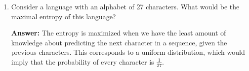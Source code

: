 \documentclass{article}
\newenvironment{QandA}{\begin{enumerate}[label=\arabic*.]}{\end{enumerate}}
\newenvironment{answer}{\par\normalfont \textbf{Answer:}}{}
\newcommand{\g}{\vert}
\begin{document}
\begin{QandA}
\begin{answer}
        \begin{align*}
            w^* &= \argmax_{w} p(Y \g X, w) \\
            &= \argmax_{w} \prod_{i=1}^n p(y_i \g x_i, w) &\text{(iid assumption)} \\
            &= \argmax_{w} \sum_{i=1}^n \log p(y_i \g x_i, w) \\
            &= \argmax_{w} \sum_{i=1}^n \left [\log \left( \frac{1}{\sqrt{2\pi \sigma^2}} \right) -  \frac{(y_i - \hat{y}_i)^2}{2\sigma^2} \right]\\
            &= \argmax_{w} \sum_{i=1}^n -\frac{(y_i - \hat{y}_i)^2}{2\sigma^2} \\
            &= \argmin_{w} \underbrace{\sum_{i=1}^n (y_i - \hat{y}_i)^2}_{\text{Mean Squared Error}}
        \end{align*} 
        Which results in minimizing the Mean Squared Error loss. \\\\
        When doing a multi-class classification problem, the assumption about the likelihood being a Categorical random variable as opposed to a Normal random variable is more natural, hence the common use of the Cross Entropy loss function. \\\\
        In fact, the same line of reasoning can be applied for answering Question 10 of this section. 
    \end{answer}

    \item Consider a language with an alphabet of 27 characters. What would be the maximal entropy of this language?
    \begin{answer}
        The entropy is maximized when we have the least amount of knowledge about predicting the next character in a sequence, given the previous characters. This corresponds to a uniform distribution, which would imply that the probability of every character is $\frac{1}{27}$.
    \end{answer}


\end{QandA}
\end{document}
